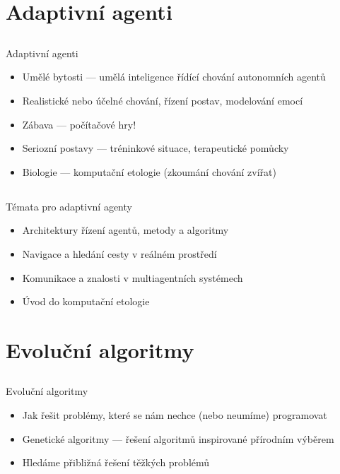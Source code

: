 \documentclass{beamer}
\begin{document}
\section{Adaptivní agenti}

\subsection{}
\begin{frame}{Adaptivní agenti}
\begin{itemize}
\item Umělé bytosti --- umělá inteligence řídící chování autonomních agentů
\item Realistické nebo účelné chování, řízení postav, modelování emocí
\item Zábava --- počítačové hry!
\item Seriozní postavy --- tréninkové situace, terapeutické pomůcky
\item Biologie --- komputační etologie (zkoumání chování zvířat)
\end{itemize}
\end{frame}

\subsection{}
\begin{frame}{Témata pro adaptivní agenty}
\begin{itemize}
\item Architektury řízení agentů, metody a algoritmy
\item Navigace a hledání cesty v reálném prostředí
\item Komunikace a znalosti v multiagentních systémech
\item Úvod do komputační etologie
\end{itemize}
\end{frame}

\section{Evoluční algoritmy}

\subsection{}
\begin{frame}{Evoluční algoritmy}
\begin{itemize}
\item Jak řešit problémy, které se nám nechce (nebo neumíme) programovat
\item Genetické algoritmy --- řešení algoritmů inspirované přírodním výběrem
\item Hledáme přibližná řešení těžkých problémů
\end{itemize}
\end{frame}
\end{document}
